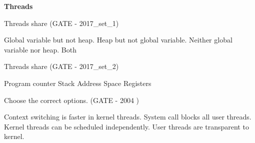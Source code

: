 \centerline{\textbf{ \LARGE Threads}}



\begin{minipage}{\linewidth}

  \question  Threads share (GATE - 2017\_set\_1)

  \begin{choices}
    \choice Global variable but not heap.
    \choice Heap but not global variable.
    \choice Neither global variable nor heap.
    \choice Both
  \end{choices}


  \end{minipage}

\vspace{0.08in}



\begin{minipage}{\linewidth}

  \question  Threads share (GATE - 2017\_set\_2)
    \begin{choices}
      \choice Program counter
      \choice Stack
      \choice Address Space
      \choice Registers
    \end{choices}


  \end{minipage}

\vspace{0.08in}



\begin{minipage}{\linewidth}

  \question Choose the correct options. (GATE - 2004 )

  \begin{choices}
    \choice Context switching is faster in kernel threads.
    \choice System call blocks all user threads.
    \choice Kernel threads can be scheduled independently.
    \choice User threads are transparent to kernel.
  \end{choices}


  \end{minipage}

\vspace{0.08in}



